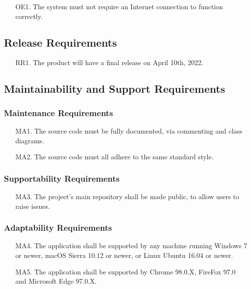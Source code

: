 \documentclass[12pt, titlepage]{article}
\begin{document}
\begin{itemize}
  \item[OE1.] The system must not require an Internet connection to function correctly.
\end{itemize}

\subsection{Release Requirements}

\begin{itemize}
  \item[RR1.] The product will have a final release on April 10th, 2022. 
\end{itemize}

\subsection{Maintainability and Support Requirements}

\subsubsection{Maintenance Requirements}

\begin{itemize}
  \item[MA1.] The source code must be fully documented, via commenting and class diagrams. 
  \item[MA2.] The source code must all adhere to the same standard style. 
\end{itemize}

\subsubsection{Supportability Requirements}

\begin{itemize}
  \item[MA3.] The project’s main repository shall be made public, to allow users to raise issues. 
\end{itemize}

\subsubsection{Adaptability Requirements}

\begin{itemize}
  \item[MA4.] The application shall be supported by any machine running Windows 7 or newer, macOS Sierra 10.12 or newer, or Linux Ubuntu 16.04 or newer.
  \item[MA5.] The application shall be supported by Chrome 98.0.X, FireFox 97.0 and Microsoft Edge 97.0.X. 
\end{itemize}
\end{document}
